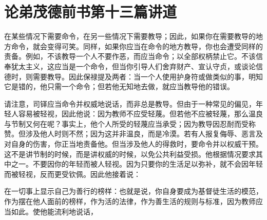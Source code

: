 

\section{论弟茂德前书第十三篇讲道}

\par

\par

在某些情况下需要命令，在另一些情况下需要教导；因此，如果你在需要教导的地方命令，就会变得可笑。同样，如果你应当在命令的地方教导，你也会遭受同样的责备。例如，不该教导一个人不要作恶，而应当命令；以全部权柄禁止它。不该信奉犹太主义，这应当是一个命令，但当你引导人们舍弃财产、宣认守贞，或谈论信德时，则需要教导。因此保禄提及两者：当一个人使用护身符或做类似的事，明知它是错的，他只需一个命令；但若他无知地去做，就应当教导他的错误。\par

请注意，司铎应当命令并权威地说话，而非总是教导。但由于一种常见的偏见，年轻人容易被轻视，因此他说：因为教师不应受轻蔑。但若他不应被轻蔑，那么温良与节制又何在呢？事实上，他个人所受的轻蔑应当承受；因为教导因忍耐而受称赞。但涉及他人时则不然；因为这并非温良，而是冷漠。若有人报复侮辱、恶言及对自身的伤害，你正当地责备他。但当涉及他人的得救时，要命令并以权威干预。这不是讲节制的时候，而是讲权威的时候，以免公共利益受损。他根据情况要求其中之一。不要因你的年轻而被人轻视。因为只要你的生活足以弥补，就不会因年轻而被轻视，反而更受钦佩。因此他接着说：\par

在一切事上显示自己为善行的榜样：也就是说，你自身要成为基督徒生活的模范，作为摆在他人面前的榜样，作为活的法律，作为善生活的规则与标准，因为教师应当如此。使他能流利地说话，\par

